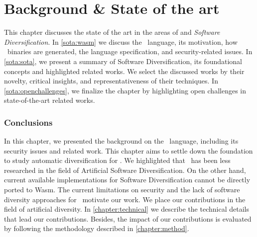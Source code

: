 \chapter{Background \& State of the art}
\label{chapter:sota}

This chapter discusses the state of the art in the areas of \emph{\wasm} and \emph{Software Diversification}. In \autoref{sota:wasm} we discuss the \wasm\ language, its motivation, how \wasm\ binaries are generated, the language specification, and security-related issues. In \autoref{sota:sota}, we present a summary of Software Diversification, its foundational concepts and highlighted related works.  
We select the discussed works by their novelty, critical insights, and representativeness of their techniques. 
In \autoref{sota:openchallenges}, we finalize the chapter by highlighting open challenges in state-of-the-art related works.







\subsection*{Conclusions}
In this chapter, we presented the background on the \wasm\ language, including its security issues and related work.
This chapter aims to settle down the foundation to study automatic diversification for \wasm. 
We highlighted  that \wasm\ has been less researched in the field of Artificial Software Diversification. 
On the other hand, current available implementations for Software Diversification cannot be directly ported to Wasm. 
The current limitations on security and the lack of software diversity approaches for \wasm\ motivate our work.
We place our contributions in the field of artificial diversity. 
In \autoref{chapter:technical} we describe the technical details that lead our contributions. 
Besides, the impact of our contributions is evaluated by following the methodology described in \autoref{chapter:method}.

